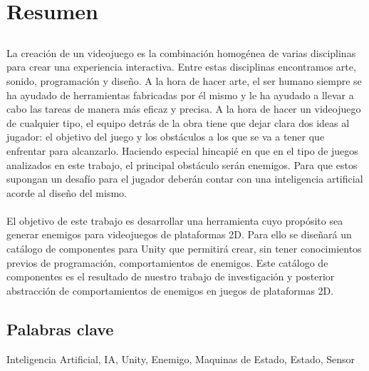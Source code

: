 \chapter*{Resumen}

\section*{\tituloPortadaVal}

La creación de un videojuego es la combinación homogénea de varias disciplinas para crear una experiencia interactiva. Entre estas disciplinas encontramos arte, sonido, programación y diseño. A la hora de hacer arte, el ser humano siempre se ha ayudado de herramientas fabricadas por él mismo y le ha ayudado a llevar a cabo las tareas de manera más eficaz y precisa.
A la hora de hacer un videojuego de cualquier tipo, el equipo detrás de la obra tiene que dejar clara dos ideas al jugador: el objetivo del juego y los obstáculos a los que se va a tener que enfrentar para alcanzarlo. Haciendo especial hincapié en que en el tipo de juegos analizados en este trabajo, el principal obstáculo serán enemigos. Para que estos supongan un desafío para el jugador deberán contar con una inteligencia artificial acorde al diseño del mismo.\\\\ 

El objetivo de este trabajo es desarrollar una herramienta cuyo propósito sea generar enemigos para videojuegos de plataformas 2D. Para ello se diseñará un catálogo de componentes para Unity que permitirá crear, sin tener conocimientos previos de programación, comportamientos de enemigos. Este catálogo de componentes es el resultado de nuestro trabajo de investigación y posterior abstracción de comportamientos de enemigos en juegos de plataformas 2D. 
\section*{Palabras clave}
   
\noindent Inteligencia Artificial, IA, Unity, Enemigo, Maquinas de Estado, Estado, Sensor

   


